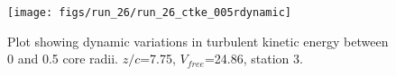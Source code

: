\begin{figure}[H]
\centering
\texttt{[image: figs/run\_26/run\_26\_ctke\_005rdynamic]}
\caption{Plot showing dynamic variations in turbulent kinetic energy between 0 and 0.5 core radii. $z/c$=7.75, $V_{free}$=24.86, station 3.}
\label{fig:run_26_ctke_005rdynamic}
\end{figure}


